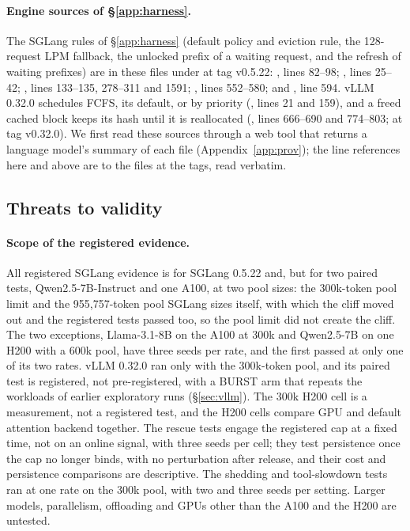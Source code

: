 \paragraph{Engine sources of \S\ref{app:harness}.} The SGLang rules of \S\ref{app:harness} (default policy and eviction rule, the 128-request LPM fallback, the unlocked prefix of a waiting request, and the refresh of waiting prefixes) are in these files under  at tag v0.5.22: , lines 82--98; , lines 25--42; , lines 133--135, 278--311 and 1591; , lines 552--580; and , line 594. vLLM 0.32.0 schedules FCFS, its default, or by priority (, lines 21 and 159), and a freed cached block keeps its hash until it is reallocated (, lines 666--690 and 774--803; at tag v0.32.0). We first read these sources through a web tool that returns a language model's summary of each file (Appendix~\ref{app:prov}); the line references here and above are to the files at the tags, read verbatim.

\subsection{Threats to validity}\label{app:threats}\label{sec:limits-old}

\paragraph{Scope of the registered evidence.} All registered SGLang evidence is for SGLang 0.5.22 and, but for two paired tests, Qwen2.5-7B-Instruct and one A100, at two pool sizes: the 300k-token pool limit and the 955,757-token pool SGLang sizes itself, with which the cliff moved out and the registered tests passed too, so the pool limit did not create the cliff. The two exceptions, Llama-3.1-8B on the A100 at 300k and Qwen2.5-7B on one H200 with a 600k pool, have three seeds per rate, and the first passed at only one of its two rates. vLLM 0.32.0 ran only with the 300k-token pool, and its paired test is registered, not pre-registered, with a BURST arm that repeats the workloads of earlier exploratory runs (\S\ref{sec:vllm}). The 300k H200 cell is a measurement, not a registered test, and the H200 cells compare GPU and default attention backend together. The rescue tests engage the registered cap at a fixed time, not on an online signal, with three seeds per cell; they test persistence once the cap no longer binds, with no perturbation after release, and their cost and persistence comparisons are descriptive. The shedding and tool-slowdown tests ran at one rate on the 300k pool, with two and three seeds per setting. Larger models, parallelism, offloading and GPUs other than the A100 and the H200 are untested.

